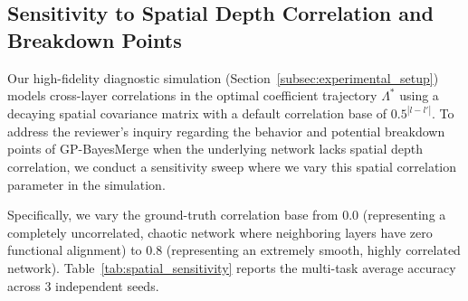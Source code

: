 \documentclass{article}
\theoremstyle{plain}
\theoremstyle{definition}
\theoremstyle{remark}
\begin{document}
\subsection{Sensitivity to Spatial Depth Correlation and Breakdown Points}

Our high-fidelity diagnostic simulation (Section~\ref{subsec:experimental_setup}) models cross-layer correlations in the optimal coefficient trajectory $\Lambda^*$ using a decaying spatial covariance matrix with a default correlation base of $0.5^{|l-l'|}$. To address the reviewer's inquiry regarding the behavior and potential breakdown points of GP-BayesMerge when the underlying network lacks spatial depth correlation, we conduct a sensitivity sweep where we vary this spatial correlation parameter in the simulation.

Specifically, we vary the ground-truth correlation base from $0.0$ (representing a completely uncorrelated, chaotic network where neighboring layers have zero functional alignment) to $0.8$ (representing an extremely smooth, highly correlated network). Table~\ref{tab:spatial_sensitivity} reports the multi-task average accuracy across 3 independent seeds.

\begin{table}[h]
\caption{\textbf{Sensitivity to Underlying Spatial Depth Correlation.} Multi-task average accuracy as the simulated ground-truth cross-layer spatial correlation is varied.}
\label{tab:spatial_sensitivity}
\vskip 0.1in
\begin{center}
\begin{small}
\end{small}
\end{center}
\vskip -0.1in
\end{table}
\end{document}

